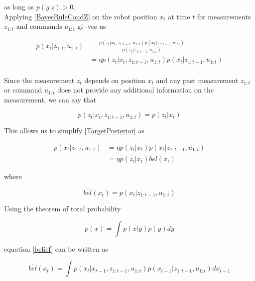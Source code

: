 \documentclass[conference]{IEEEtran}
\begin{document}
as long as $p(y|z)>0$.\\

Applying \ref{BayesRuleCondZ} on the robot position $x_t$ at time $t$ for measurements $z_{1:t}$ and commands $u_{1:t}$ gi	-ves us

\begin{equation}\label{TargetPosterior}
\begin{aligned}
p(x_t|z_{1:t},u_{1:t}) &= \frac{p(z_t|x_t,z_{1:t-1},u_{1:t}) p(x_t|z_{1:t-1},u_{1:t})}{p(z_t|z_{1:t-1},u_{1:t})}\\
& = \eta p(z_t|x_t,z_{1:t-1},u_{1:t}) p(x_t|z_{1:t-1},u_{1:t})\\
\end{aligned}
\end{equation}

Since the measurement $z_t$ depends on position $x_t$ and any past measurement $z_{1:t}$ or command $u_{1:t} $ does not provide any additional information on the measurement, we can say that

\begin{equation}\label{SimplTargPost}
p(z_t|x_t,z_{1:t-1},u_{1:t}) = p(z_t|x_t)
\end{equation}

This allows us to simplify \ref{TargetPosterior} as

\begin{equation}\label{MoreSimplTargPost}
\begin{aligned}
p(x_t|z_{1:t},u_{1:t}) &= \eta p(z_t|x_t) p(x_t|z_{1:t-1}, u_{1:t})\\
&= \eta p(z_t|x_t) \overline{bel}(x_t)
\end{aligned}
\end{equation}

where

\begin{equation}\label{belief}
\overline{bel}(x_t) = p(x_t|z_{1:t-1}, u_{1:t})
\end{equation}

Using the theorem of total probability

\begin{equation}
p(x) = \int p(x|y) p(y) dy
\end{equation}

equation \ref{belief} can be written as 

\begin{equation}
\overline{bel}(x_t) = \int p(x_t|x_{t-1}, z_{1:t-1}, u_{1:t}) p(x_{t-1}|z_{1:t-1}, u_{1:t}) dx_{t-1}
\end{equation}
\end{document}
